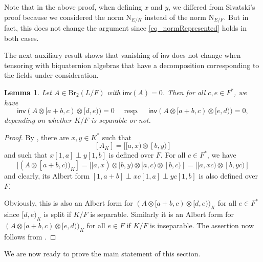 \documentclass{amsart}
\newtheorem{lemma}[definition]{Lemma}
\numberwithin{equation}{section}
\newcommand{\BrTwo}{\mathrm{Br}_2}
\newcommand{\quat}[1]{[#1)}
\newcommand{\norm}{\mathrm{N}}
\newcommand{\inv}{\mathsf{inv}}
\begin{document}
Note that in the above proof, when defining $x$ and  $y$, we differed from Sivatski's proof because we considered the norm $\norm_{E/K}$ instead of the norm $\norm_{E/F}$.
But in fact, this does not change the argument since \eqref{eq_normRepresented} holds in both cases.

The next auxiliary result shows that vanishing of $\inv$ does not change when tensoring with biquaternion algebras that have a decomposition corresponding to the fields under consideration.

\begin{lemma} \label{lem_reducing}
    Let $A \in \BrTwo(L / F)$ with $\inv(A) = 0$.
    Then for all $c, e \in F^\ast$, we have 
    \[\inv(A \otimes \quat{a+b, c} \otimes \quat{d, e}) = 0 \quad \text{ resp. } \quad \inv(A \otimes \quat{a+b, c} \otimes \quat{e, d}) = 0,\]
    depending on whether $K / F$ is separable or not.
\end{lemma}
\begin{proof}
    By , there are $x, y \in K^\ast$ such that 
    \[[A_{K}] = [\quat{a, x} \otimes \quat{b, y}]\]
    and such that $x [1, a] \perp y[1, b]$ is defined over $F$.
    For all $c \in F^\ast$, we have
    \[[(A \otimes \quat{a + b, c})_K] = [\quat{a, x} \otimes \quat{b, y} \otimes \quat{a, c} \otimes \quat{b, c}] = [\quat{a, x c} \otimes \quat{b, y c}]\]
    and clearly, its Albert form $[1, a+b] \perp x c[1, a] \perp y c [1, b]$ is also defined over $F$.
    
    Obviously, this is also an Albert form for $(A \otimes \quat{a+b, c} \otimes \quat{d, e})_K$ for all $e \in F^\ast$ since $\quat{d, e}_K$ is split if $K/F$ is separable.
    Similarly it is an Albert form for $(A \otimes \quat{a+b, c} \otimes \quat{e, d})_K$ for all $e \in F$ if $K/F$ is inseparable.
    The assertion now follows from .
\end{proof}

We are now ready to prove the main statement of this section.
\end{document}
